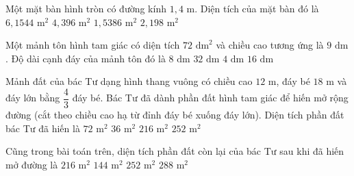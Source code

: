 \begin{ex} %
Một mặt bàn hình tròn có đường kính $1{,}4\text{ m}$. Diện tích của mặt bàn đó là
\choice
{$6{,}1544\text{ m}^2$}
{$4{,}396\text{ m}^2$}
{\True $1{,}5386\text{ m}^2$}
{$2{,}198\text{ m}^2$}
\end{ex}

\begin{ex} %
Một mảnh tôn hình tam giác có diện tích $72\text{ dm}^2$ và chiều cao tương ứng là $9\text{ dm}$. Độ dài cạnh đáy của mảnh tôn đó là
\choice
{$8\text{ dm}$}
{$32\text{ dm}$}
{$4\text{ dm}$}
{\True $16\text{ dm}$}
\end{ex}

\begin{ex} %
Mảnh đất của bác Tư dạng hình thang vuông có chiều cao $12\text{ m}$, đáy bé $18\text{ m}$ và đáy lớn bằng $\dfrac{4}{3}$ đáy bé. Bác Tư đã dành phần đất hình tam giác để hiến mở rộng đường (cắt theo chiều cao hạ từ đỉnh đáy bé xuống đáy lớn). Diện tích phần đất bác Tư đã hiến là
\choice
{$72\text{ m}^2$}
{\True $36\text{ m}^2$}
{$216\text{ m}^2$}
{$252\text{ m}^2$}
\end{ex}

\begin{ex} %
Cũng trong bài toán trên, diện tích phần đất còn lại của bác Tư sau khi đã hiến mở đường là
\choice
{\True $216\text{ m}^2$}
{$144\text{ m}^2$}
{$252\text{ m}^2$}
{$288\text{ m}^2$}
\end{ex}

